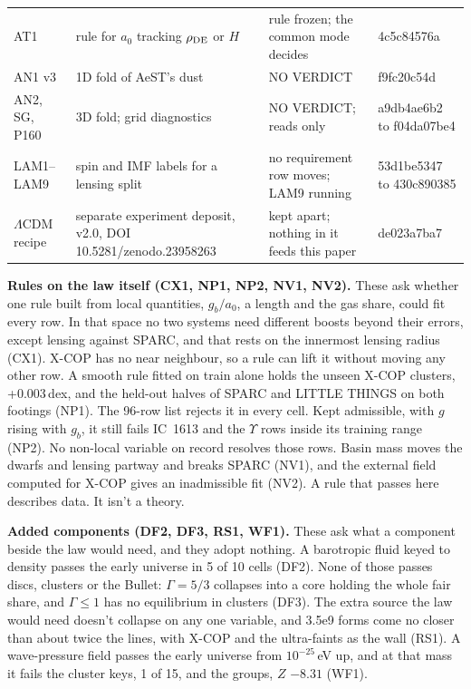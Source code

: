 \documentclass[10pt]{article}
\begin{document}
\begin{table}[!htbp]
\begin{tabular}{>{\raggedright\arraybackslash}p{1.9cm}>{\raggedright\arraybackslash}p{4.4cm}>{\raggedright\arraybackslash}p{6.2cm}>{\raggedright\arraybackslash}p{2.2cm}}
AT1 & rule for $a_0$ tracking $\rho_{\rm DE}$ or $H$ & rule frozen; the common mode decides & 4c5c84576a\\
AN1 v3 & 1D fold of AeST's dust & NO VERDICT & f9fc20c54d\\
AN2, SG, P160 & 3D fold; grid diagnostics & NO VERDICT; reads only & a9db4ae6b2 to f04da07be4\\
LAM1--LAM9 & spin and IMF labels for a lensing split & no requirement row moves; LAM9 running & 53d1be5347 to 430c890385\\
$\Lambda$CDM recipe & separate experiment deposit, v2.0, DOI 10.5281/zenodo.23958263 & kept apart; nothing in it feeds this paper & de023a7ba7\\
\bottomrule
\end{tabular}
\end{table}

\textbf{Rules on the law itself (CX1, NP1, NP2, NV1, NV2).} These ask whether one rule built from local quantities, $g_b/a_0$, a length and the gas share, could fit every row. In that space no two systems need different boosts beyond their errors, except lensing against SPARC, and that rests on the innermost lensing radius (CX1). X-COP has no near neighbour, so a rule can lift it without moving any other row. A smooth rule fitted on train alone holds the unseen X-COP clusters, +0.003\,dex, and the held-out halves of SPARC and LITTLE THINGS on both footings (NP1). The 96-row list rejects it in every cell. Kept admissible, with $g$ rising with $g_b$, it still fails IC~1613 and the $\Upsilon$ rows inside its training range (NP2). No non-local variable on record resolves those rows. Basin mass moves the dwarfs and lensing partway and breaks SPARC (NV1), and the external field computed for X-COP gives an inadmissible fit (NV2). A rule that passes here describes data. It isn't a theory.

\textbf{Added components (DF2, DF3, RS1, WF1).} These ask what a component beside the law would need, and they adopt nothing. A barotropic fluid keyed to density passes the early universe in 5 of 10 cells (DF2). None of those passes discs, clusters or the Bullet: $\Gamma=5/3$ collapses into a core holding the whole fair share, and $\Gamma\le1$ has no equilibrium in clusters (DF3). The extra source the law would need doesn't collapse on any one variable, and 3.5e9 forms come no closer than about twice the lines, with X-COP and the ultra-faints as the wall (RS1). A wave-pressure field passes the early universe from $10^{-25}$\,eV up, and at that mass it fails the cluster keys, 1 of 15, and the groups, $Z$ $-8.31$ (WF1).
\end{document}
